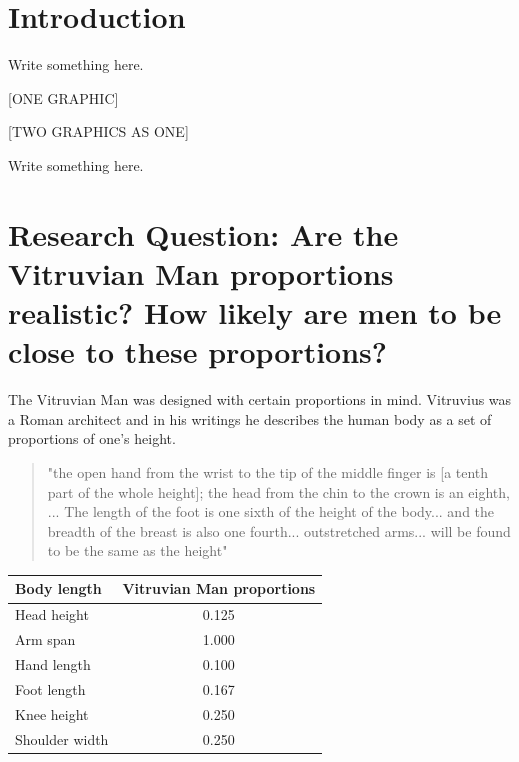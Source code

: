 \documentclass[]{article}
\begin{document}
\vskip -8.5pt




\noindent  

\section{Introduction}
\label{sec:intro}

Write something here.

{[}ONE GRAPHIC{]}

{[}TWO GRAPHICS AS ONE{]}

Write something here.

\section{Research Question:  Are the Vitruvian Man proportions realistic? How likely are men to be close to these proportions?}
\label{sec:rq}

The Vitruvian Man was designed with certain proportions in mind.
Vitruvius was a Roman architect and in his writings he describes the
human body as a set of proportions of one's height. \newline

\begin{quote}
"the open hand from the wrist to the tip of the middle finger is [a tenth part of the whole height]; the head from the chin to the crown is an eighth, ... The length of the foot is one sixth of the height of the body... and the breadth of the breast is also one fourth... outstretched arms... will be found to be the same as the height"
\end{quote}

\citep{Vitruvius} \newline

\begin{center}
\begin{tabular}{ l c}
  \label{tab:vitruvian-props}
  \textbf{Body length} & \textbf{Vitruvian Man proportions}\\
  \hline
  Head height & 0.125\\
  Arm span & 1.000\\
  Hand length & 0.100\\
  Foot length & 0.167\\
  Knee height & 0.250\\
  Shoulder width & 0.250\\
\end{tabular}
\end{center}
\end{document}
